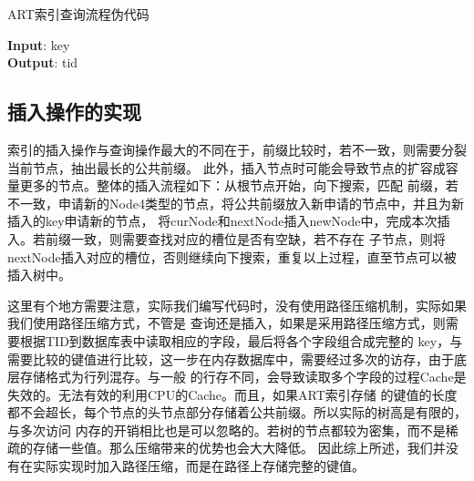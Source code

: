 \begin{breakablealgorithm} 
    \caption{ART索引查询流程伪代码} 
    \begin{algorithmic}[1]
    \begin{footnotesize}
    \hspace*{\algorithmicindent} \textbf{Input}{: key}\\
    \hspace*{\algorithmicindent} \textbf{Output}{: tid}


            \ENDIF

            \ENDIF
        \ELSE 
        \ENDIF
    \ENDWHILE
    \end{footnotesize}
    \end{algorithmic}
\end{breakablealgorithm}

\subsection{插入操作的实现}
索引的插入操作与查询操作最大的不同在于，前缀比较时，若不一致，则需要分裂当前节点，抽出最长的公共前缀。
此外，插入节点时可能会导致节点的扩容成容量更多的节点。整体的插入流程如下：从根节点开始，向下搜索，匹配
前缀，若不一致，申请新的Node4类型的节点，将公共前缀放入新申请的节点中，并且为新插入的key申请新的节点，
将curNode和nextNode插入newNode中，完成本次插入。若前缀一致，则需要查找对应的槽位是否有空缺，若不存在
子节点，则将nextNode插入对应的槽位，否则继续向下搜索，重复以上过程，直至节点可以被插入树中。

这里有个地方需要注意，实际我们编写代码时，没有使用路径压缩机制，实际如果我们使用路径压缩方式，不管是
查询还是插入，如果是采用路径压缩方式，则需要根据TID到数据库表中读取相应的字段，最后将各个字段组合成完整的
key，与需要比较的键值进行比较，这一步在内存数据库中，需要经过多次的访存，由于底层存储格式为行列混存。与一般
的行存不同，会导致读取多个字段的过程Cache是失效的。无法有效的利用CPU的Cache。而且，如果ART索引存储
的键值的长度都不会超长，每个节点的头节点部分存储着公共前缀。所以实际的树高是有限的，与多次访问
内存的开销相比也是可以忽略的。若树的节点都较为密集，而不是稀疏的存储一些值。那么压缩带来的优势也会大大降低。 
因此综上所述，我们并没有在实际实现时加入路径压缩，而是在路径上存储完整的键值。


